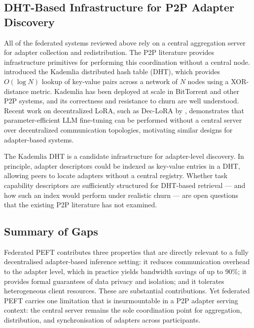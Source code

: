 \subsection{DHT-Based Infrastructure for P2P Adapter Discovery}
\label{sec:p2p_federated:dht}

All of the federated systems reviewed above rely on a central aggregation server for
adapter collection and redistribution. The P2P literature provides infrastructure
primitives for performing this coordination without a central node. \citet{MaymounkovKademlia2002}
introduced the Kademlia distributed hash table (DHT), which provides $O(\log N)$
lookup of key-value pairs across a network of $N$ nodes using a XOR-distance metric.
Kademlia has been deployed at scale in BitTorrent and other P2P systems, and its
correctness and resistance to churn are well understood.
Recent work on decentralized LoRA, such as Dec-LoRA by \citet{Ghiasvand2025}, demonstrates that parameter-efficient LLM fine‑tuning can be performed without a central server over decentralized communication topologies, motivating similar designs for adapter-based systems.

The Kademlia DHT is a candidate infrastructure for adapter-level discovery. In principle, adapter descriptors could be indexed as key-value entries in a DHT, allowing peers to locate adapters without a central registry. Whether task capability descriptors are sufficiently structured for DHT-based retrieval — and how such an index would perform under realistic churn — are open questions that the existing P2P literature has not examined.

\subsection{Summary of Gaps}
\label{sec:p2p_federated:gap}

Federated PEFT contributes three properties that are directly relevant to a fully decentralised adapter-based inference setting: it reduces communication overhead to the adapter level, which in practice yields bandwidth savings of up to 90\%; it provides formal guarantees of data privacy and isolation; and it tolerates heterogeneous client resources. These are substantial contributions. Yet federated PEFT carries one limitation that is insurmountable in a P2P adapter serving context: the central server remains the sole coordination point for aggregation, distribution, and synchronisation of adapters across participants.

